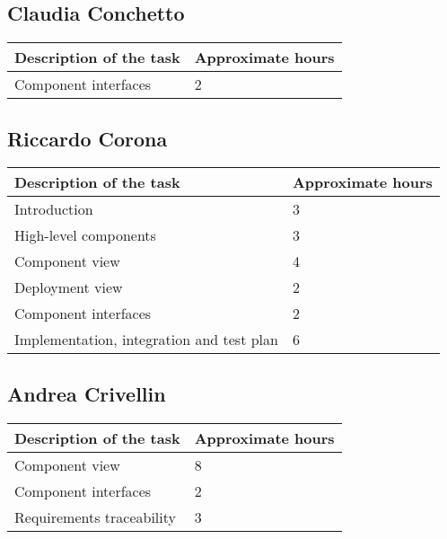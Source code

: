 
%

\subsection{Claudia Conchetto}
\begin{table}[h!]
\begin{tabular}{|l|l|}
\hline
\textbf{Description of the task} & \textbf{Approximate hours} \\ \hline
Component interfaces & 2 \\ \hline
\end{tabular}
\end{table}

\subsection{Riccardo Corona}
\begin{table}[h!]
\begin{tabular}{|l|l|}
\hline
\textbf{Description of the task} & \textbf{Approximate hours} \\ \hline
Introduction & 3 \\ \hline
High-level components & 3 \\ \hline
Component view & 4 \\ \hline
Deployment view & 2 \\ \hline
Component interfaces & 2 \\ \hline
Implementation, integration and test plan & 6 \\ \hline
\end{tabular}
\end{table}

\subsection{Andrea Crivellin}
\begin{table}[h!]
\begin{tabular}{|l|l|}
\hline
\textbf{Description of the task} & \textbf{Approximate hours} \\ \hline
Component view & 8 \\ \hline
Component interfaces & 2 \\ \hline
Requirements traceability & 3 \\ \hline
\end{tabular}
\end{table}

%